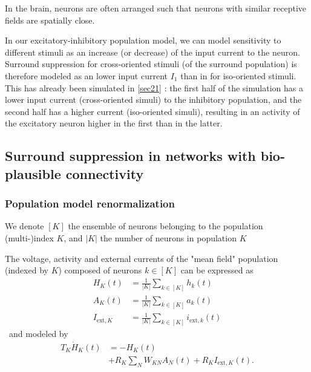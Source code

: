 \documentclass[10pt,conference,compsocconf,a4paper]{IEEEtran}
\newcommand*{\shortautoref}[1]{%
	\begingroup
	\def\equationautorefname{\textsc{Eq.}}%
	\def\tableautorefname{\textsc{Tab.}}%
	\def\figureautorefname{\textsc{Fig.}}%
	\autoref{#1}%
	\endgroup
}
\begin{document}
		In the brain, neurons are often arranged such that neurons with similar receptive fields are spatially close.

		In our excitatory-inhibitory population model, we can model sensitivity to different stimuli as an increase (or decrease) of the input current to the neuron. Surround suppression for cross-oriented stimuli (of the surround population) is therefore modeled as an lower input current $I_1$ than in for iso-oriented stimuli. This has already been simulated in \shortautoref{sec21} : the first half of the simulation has a lower input current (cross-oriented simuli) to the inhibitory population, and the second half has a higher current (iso-oriented simuli), resulting in an activity of the excitatory neuron higher in the first than in the latter.

	\subsection{Surround suppression in networks with bio-plausible connectivity}
	\label{sec23}

		\subsubsection{Population model renormalization}
		\label{sec231}

			We denote $[K]$ the ensemble of neurons belonging to the population (multi-)index $K$, and $|K|$ the number of neurons in population $K$

			The voltage, activity and external currents of the "mean field" population (indexed by $K$) composed of neurons $k \in [K]$ can be expressed as
\
			\begin{equation*}
				\begin{aligned}
					H_K(t) &= \frac{1}{|K|} \sum_{k \in [K]} h_k(t)\\
					A_K(t) &= \frac{1}{|K|} \sum_{k \in [K]} a_k(t)\\
					I_{\text{ext},K} &= \frac{1}{|K|} \sum_{k \in [K]} i_{\text{ext},k}(t)
				\end{aligned}
			\end{equation*}
\
			and modeled by 
\
			\begin{equation*}
				\begin{aligned}
					T_K \dot H_K(t) &= -H_K(t) \\ &+ R_K \sum_{N} W_{KN} A_N(t) + R_K I_{\text{ext},K}(t).
				\end{aligned}
			\end{equation*}
\end{document}
